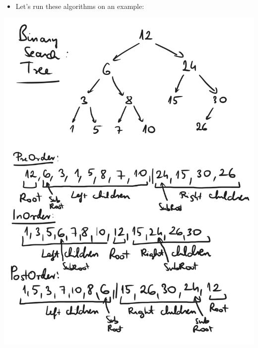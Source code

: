 \begin{itemize}
    \item Let's run these algorithms on an example:
\end{itemize}

\begin{center}
    \includegraphics[width=\linewidth]{11/11/bst_walks.png}
\end{center}

